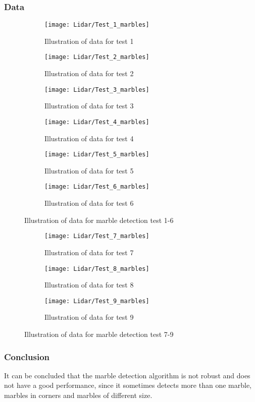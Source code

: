 \documentclass[../Head/Main.tex]{subfiles}
\begin{document}
\subsubsection*{Data}
\begin{figure}[H]
  \begin{subfigure}[b]{0.3\textwidth}
  	\centering
    \texttt{[image: Lidar/Test\_1\_marbles]}
    \caption{Illustration of data for test 1}
    \label{fig:Marbletest1}
  \end{subfigure}
  \hfill
  \begin{subfigure}[b]{0.3\textwidth}
  	\centering
    \texttt{[image: Lidar/Test\_2\_marbles]}
    \caption{Illustration of data for test 2}
    \label{fig:Marblestest2}
  \end{subfigure}
  \hfill
  \begin{subfigure}[b]{0.3\textwidth}
    \centering
    \texttt{[image: Lidar/Test\_3\_marbles]}
    \caption{Illustration of data for test 3}
    \label{fig:Marblestest3}
  \end{subfigure}
  \hfill
  \begin{subfigure}[b]{0.3\textwidth}
    \centering
    \texttt{[image: Lidar/Test\_4\_marbles]}
    \caption{Illustration of data for test 4}
    \label{fig:Marblestest4}
  \end{subfigure}
  \hfill
  \begin{subfigure}[b]{0.3\textwidth}
    \centering
    \texttt{[image: Lidar/Test\_5\_marbles]}
    \caption{Illustration of data for test 5}
    \label{fig:Marblestest5}
  \end{subfigure}
  \hfill
  \begin{subfigure}[b]{0.3\textwidth}
    \centering
    \texttt{[image: Lidar/Test\_6\_marbles]}
    \caption{Illustration of data for test 6}
    \label{fig:Marblestest6}
  \end{subfigure}
  \caption{Illustration of data for marble detection test 1-6}
  \label{fig:Marblestests16}
\end{figure}
\begin{figure}[H]
  \begin{subfigure}[b]{0.3\textwidth}
    \centering
    \texttt{[image: Lidar/Test\_7\_marbles]}
    \caption{Illustration of data for test 7}
    \label{fig:Marblestest7}
  \end{subfigure}
  \hfill
  \begin{subfigure}[b]{0.3\textwidth}
    \centering
    \texttt{[image: Lidar/Test\_8\_marbles]}
    \caption{Illustration of data for test 8}
    \label{fig:Marblestest8}
  \end{subfigure}
  \hfill
  \begin{subfigure}[b]{0.3\textwidth}
    \centering
    \texttt{[image: Lidar/Test\_9\_marbles]}
    \caption{Illustration of data for test 9}
    \label{fig:Marblestest9}
  \end{subfigure}
  \caption{Illustration of data for marble detection test 7-9}
  \label{fig:Marblestests79}
\end{figure}

\subsubsection*{Conclusion}
It can be concluded that the marble detection algorithm is not robust and does not have a good performance, since it sometimes detects more than one marble, marbles in corners and marbles of different size.
\end{document}
